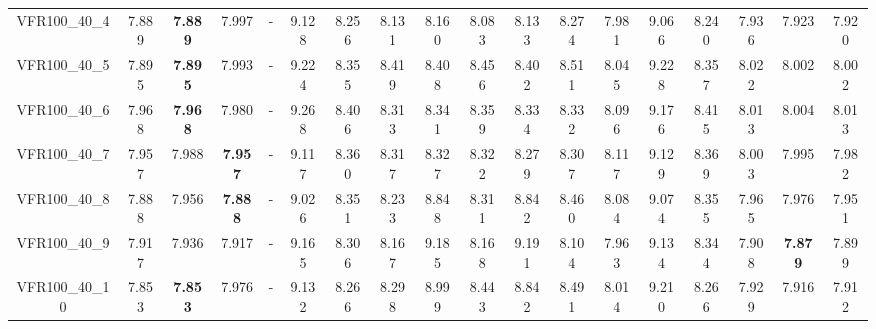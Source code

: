 \begin{tabular}{cc|ccc|ccccccccccccc}
VFR100\_40\_4      & 7.889            & {\bf 7.889}      & 7.997            & -                & 9.128            & 8.256            & 8.131            & 8.160            & 8.083            & 8.133            & 8.274            & 7.981            & 9.066            & 8.240            & 7.936            & 7.923            & 7.920           \\ 
VFR100\_40\_5      & 7.895            & {\bf 7.895}      & 7.993            & -                & 9.224            & 8.355            & 8.419            & 8.408            & 8.456            & 8.402            & 8.511            & 8.045            & 9.228            & 8.357            & 8.022            & 8.002            & 8.002           \\ 
VFR100\_40\_6      & 7.968            & {\bf 7.968}      & 7.980            & -                & 9.268            & 8.406            & 8.313            & 8.341            & 8.359            & 8.334            & 8.332            & 8.096            & 9.176            & 8.415            & 8.013            & 8.004            & 8.013           \\ 
VFR100\_40\_7      & 7.957            & 7.988            & {\bf 7.957}      & -                & 9.117            & 8.360            & 8.317            & 8.327            & 8.322            & 8.279            & 8.307            & 8.117            & 9.129            & 8.369            & 8.003            & 7.995            & 7.982           \\ 
VFR100\_40\_8      & 7.888            & 7.956            & {\bf 7.888}      & -                & 9.026            & 8.351            & 8.233            & 8.848            & 8.311            & 8.842            & 8.460            & 8.084            & 9.074            & 8.355            & 7.965            & 7.976            & 7.951           \\ 
VFR100\_40\_9      & 7.917            & 7.936            & 7.917            & -                & 9.165            & 8.306            & 8.167            & 9.185            & 8.168            & 9.191            & 8.104            & 7.963            & 9.134            & 8.344            & 7.908            & {\bf 7.879}      & 7.899           \\ 
VFR100\_40\_10     & 7.853            & {\bf 7.853}      & 7.976            & -                & 9.132            & 8.266            & 8.298            & 8.999            & 8.443            & 8.842            & 8.491            & 8.014            & 9.210            & 8.266            & 7.929            & 7.916            & 7.912           \\ 

\end{tabular}
